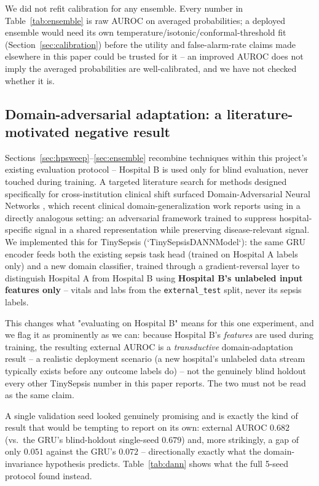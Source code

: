\documentclass[11pt]{article}
\begin{document}
We did not refit calibration for any ensemble. Every number in Table~\ref{tab:ensemble} is raw AUROC on averaged probabilities; a deployed ensemble would need its own temperature/isotonic/conformal-threshold fit (Section~\ref{sec:calibration}) before the utility and false-alarm-rate claims made elsewhere in this paper could be trusted for it -- an improved AUROC does not imply the averaged probabilities are well-calibrated, and we have not checked whether it is.

\subsection{Domain-adversarial adaptation: a literature-motivated negative result}
\label{sec:dann}
Sections~\ref{sec:hpsweep}--\ref{sec:ensemble} recombine techniques within this project's existing evaluation protocol -- Hospital B is used only for blind evaluation, never touched during training. A targeted literature search for methods designed specifically for cross-institution clinical shift surfaced Domain-Adversarial Neural Networks \citep[DANN;][]{ganin2016domain}, which recent clinical domain-generalization work reports using in a directly analogous setting: an adversarial framework trained to suppress hospital-specific signal in a shared representation while preserving disease-relevant signal. We implemented this for TinySepsis (`TinySepsisDANNModel`): the same GRU encoder feeds both the existing sepsis task head (trained on Hospital A labels only) and a new domain classifier, trained through a gradient-reversal layer to distinguish Hospital A from Hospital B using \textbf{Hospital B's unlabeled input features only} -- vitals and labs from the \texttt{external\_test} split, never its sepsis labels.

This changes what "evaluating on Hospital B" means for this one experiment, and we flag it as prominently as we can: because Hospital B's \emph{features} are used during training, the resulting external AUROC is a \emph{transductive} domain-adaptation result -- a realistic deployment scenario (a new hospital's unlabeled data stream typically exists before any outcome labels do) -- not the genuinely blind holdout every other TinySepsis number in this paper reports. The two must not be read as the same claim.

A single validation seed looked genuinely promising and is exactly the kind of result that would be tempting to report on its own: external AUROC $0.682$ (vs.\ the GRU's blind-holdout single-seed $0.679$) and, more strikingly, a gap of only $0.051$ against the GRU's $0.072$ -- directionally exactly what the domain-invariance hypothesis predicts. Table~\ref{tab:dann} shows what the full 5-seed protocol found instead.
\end{document}
